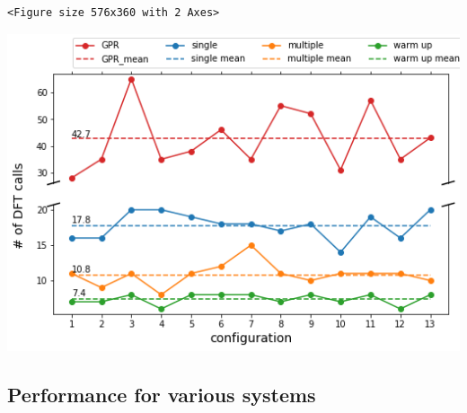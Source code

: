 \documentclass[aps,prl,citeautoscript,preprint,citeautoscript,showkeys]{revtex4-1}
\begin{document}
\begin{verbatim}
<Figure size 576x360 with 2 Axes>
\end{verbatim}


\begin{center}
\includegraphics[width=.9\linewidth]{obipy-resources/488c510fd61eaf8a765856c1b3f36ad3-27044fEa.png}
\end{center}


\subsection{Performance for various systems}
\label{sec:org5312cd6}
\end{document}
